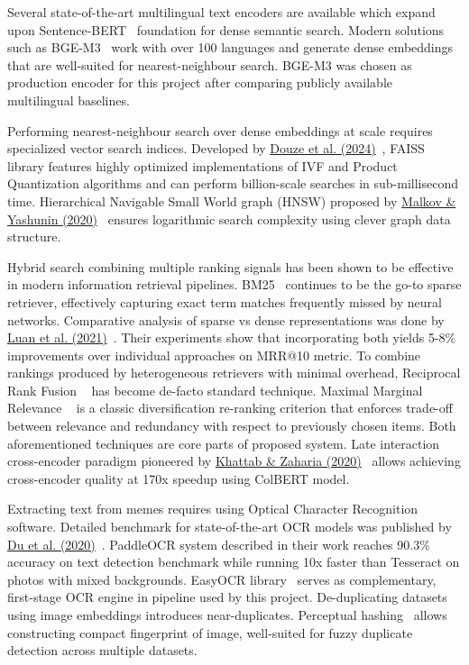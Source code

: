 \documentclass[a4paper,12pt]{article}
\begin{document}
Several state-of-the-art multilingual text encoders are available which expand upon Sentence-BERT~\cite{reimers2019sbert} foundation for dense semantic search. Modern solutions such as BGE-M3~\cite{chen2024bge} work with over 100 languages and generate dense embeddings that are well-suited for nearest-neighbour search. BGE-M3 was chosen as production encoder for this project after comparing publicly available multilingual baselines.

Performing nearest-neighbour search over dense embeddings at scale requires specialized vector search indices. Developed by \href{https://arxiv.org/abs/2401.08281}{Douze et al. (2024)}~\cite{douze2024faiss}, FAISS library features highly optimized implementations of IVF and Product Quantization algorithms and can perform billion-scale searches in sub-millisecond time. Hierarchical Navigable Small World graph (HNSW) proposed by \href{https://arxiv.org/abs/1603.09320}{Malkov \& Yashunin (2020)}~\cite{malkov2020hnsw} ensures logarithmic search complexity using clever graph data structure.

Hybrid search combining multiple ranking signals has been shown to be effective in modern information retrieval pipelines. BM25~\cite{robertson2009bm25} continues to be the go-to sparse retriever, effectively capturing exact term matches frequently missed by neural networks. Comparative analysis of sparse vs dense representations was done by \href{https://aclanthology.org/2021.tacl-1.20/}{Luan et al. (2021)}~\cite{luan2021sparse}. Their experiments show that incorporating both yields 5-8\% improvements over individual approaches on MRR@10 metric. To combine rankings produced by heterogeneous retrievers with minimal overhead, Reciprocal Rank Fusion ~\cite{cormack2009rrf} has become de-facto standard technique. Maximal Marginal Relevance ~\cite{carbonell1998mmr} is a classic diversification re-ranking criterion that enforces trade-off between relevance and redundancy with respect to previously chosen items. Both aforementioned techniques are core parts of proposed system. Late interaction cross-encoder paradigm pioneered by \href{https://arxiv.org/abs/2004.12832}{Khattab \& Zaharia (2020)}~\cite{khattab2020colbert} allows achieving cross-encoder quality at 170x speedup using ColBERT model.

Extracting text from memes requires using Optical Character Recognition software. Detailed benchmark for state-of-the-art OCR models was published by \href{https://arxiv.org/abs/2009.09941}{Du et al. (2020)}~\cite{du2020ppocr}. PaddleOCR system described in their work reaches 90.3\% accuracy on text detection benchmark while running 10x faster than Tesseract on photos with mixed backgrounds. EasyOCR library~\cite{jaidedai2020easyocr} serves as complementary, first-stage OCR engine in pipeline used by this project. De-duplicating datasets using image embeddings introduces near-duplicates. Perceptual hashing~\cite{zauner2010phash} allows constructing compact fingerprint of image, well-suited for fuzzy duplicate detection across multiple datasets.
\end{document}
